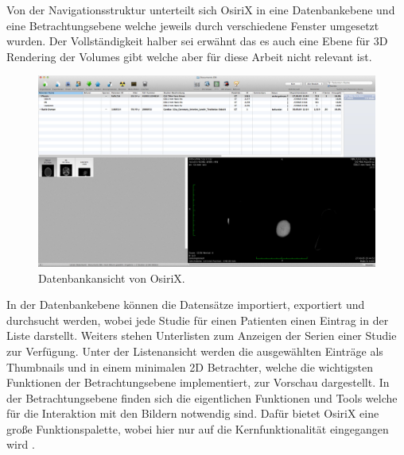  Von der Navigationsstruktur unterteilt sich OsiriX in eine Datenbankebene und eine Betrachtungsebene welche jeweils durch verschiedene Fenster umgesetzt wurden.
Der Vollständigkeit halber sei erwähnt das es auch eine Ebene für 3D Rendering der Volumes gibt welche aber für diese Arbeit nicht relevant ist.
\begin{figure}[t]
	\centering
	\includegraphics[width=0.8\linewidth]{img/c2_osirix_db_view.jpg}
	\caption{Datenbankansicht von OsiriX.}
\end{figure}
In der Datenbankebene können die Datensätze importiert, exportiert und durchsucht werden, wobei jede Studie für einen Patienten einen Eintrag in der Liste darstellt.
Weiters stehen Unterlisten zum Anzeigen der Serien einer Studie zur Verfügung.
Unter der Listenansicht werden die ausgewählten Einträge als Thumbnails und in einem minimalen 2D Betrachter,
welche die wichtigsten Funktionen der Betrachtungsebene implementiert, zur Vorschau dargestellt.
In der Betrachtungsebene finden sich die eigentlichen Funktionen und Tools welche für die Interaktion mit den Bildern notwendig sind.
Dafür bietet OsiriX eine große Funktionspalette, wobei hier nur auf die Kernfunktionalität eingegangen wird \cite{osirix}.
